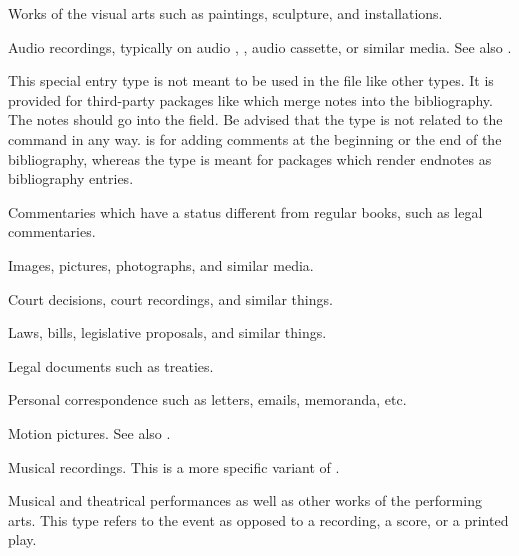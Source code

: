 \documentclass{ltxdockit}[2011/03/25]
\begin{document}
\begin{typelist}


Works of the visual arts such as paintings, sculpture, and installations.


Audio recordings, typically on audio , , audio cassette, or similar media. See also .


This special entry type is not meant to be used in the  file like other types. It is provided for third-party packages like  which merge notes into the bibliography. The notes should go into the  field. Be advised that the  type is not related to the  command in any way.  is for adding comments at the beginning or the end of the bibliography, whereas the  type is meant for packages which render endnotes as bibliography entries.


Commentaries which have a status different from regular books, such as legal commentaries.


Images, pictures, photographs, and similar media.


Court decisions, court recordings, and similar things.


Laws, bills, legislative proposals, and similar things.


Legal documents such as treaties.


Personal correspondence such as letters, emails, memoranda, etc.


Motion pictures. See also .


Musical recordings. This is a more specific variant of .


Musical and theatrical performances as well as other works of the performing arts. This type refers to the event as opposed to a recording, a score, or a printed play.


\end{typelist}
\end{document}
